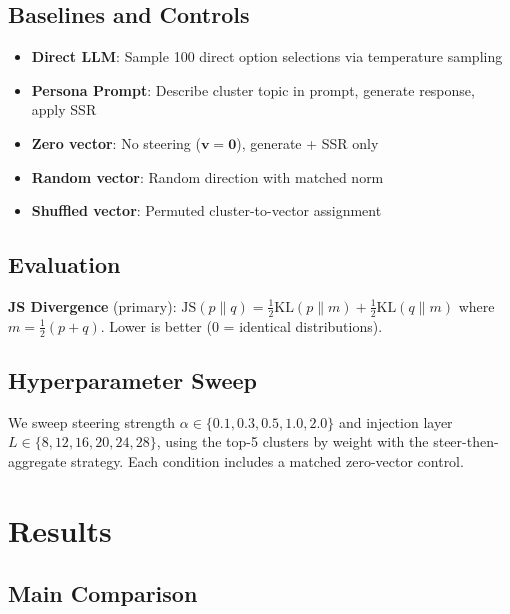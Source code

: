 \documentclass[letterpaper]{article}
\newcommand{\js}{\text{JS}}
\newcommand{\bfv}{\mathbf{v}}
\begin{document}
\subsection{Baselines and Controls}

\begin{itemize}[nosep,leftmargin=*]
    \item \textbf{Direct LLM}: Sample 100 direct option selections via temperature sampling
    \item \textbf{Persona Prompt}: Describe cluster topic in prompt, generate response, apply SSR
    \item \textbf{Zero vector}: No steering ($\bfv = \mathbf{0}$), generate + SSR only
    \item \textbf{Random vector}: Random direction with matched norm
    \item \textbf{Shuffled vector}: Permuted cluster-to-vector assignment
\end{itemize}

\subsection{Evaluation}

\textbf{JS Divergence} (primary): $\js(p \| q) = \frac{1}{2}\text{KL}(p \| m) + \frac{1}{2}\text{KL}(q \| m)$ where $m = \frac{1}{2}(p+q)$. Lower is better (0 = identical distributions).

\subsection{Hyperparameter Sweep}

We sweep steering strength $\alpha \in \{0.1, 0.3, 0.5, 1.0, 2.0\}$ and injection layer $L \in \{8, 12, 16, 20, 24, 28\}$, using the top-5 clusters by weight with the steer-then-aggregate strategy. Each condition includes a matched zero-vector control.

\section{Results}
\label{sec:results}

\subsection{Main Comparison}
\end{document}
